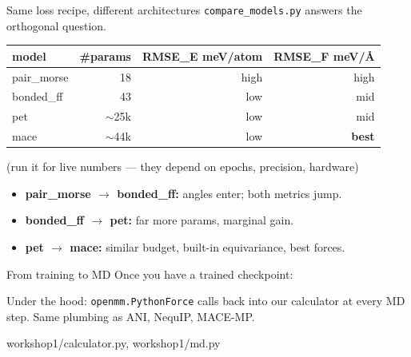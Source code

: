 \documentclass[aspectratio=169,11pt]{beamer}
\newcommand{\srcref}[1]{{\color{muted}\ttfamily\footnotesize #1}}
\begin{document}
\begin{frame}{Same loss recipe, different architectures}
  \texttt{compare\_models.py} answers the orthogonal question.

  \vspace{0.6em}
  \centering
  \small
  \begin{tabular}{lrrr}
    \toprule
    model & \#params & RMSE\_E meV/atom & RMSE\_F meV/\AA \\
    \midrule
    pair\_morse  &     18 & high & high \\
    bonded\_ff   &     43 & low  & mid  \\
    pet          & $\sim$25k & low  & mid  \\
    mace         & $\sim$44k & low  & \textbf{best} \\
    \bottomrule
  \end{tabular}

  {\color{muted}\scriptsize (run it for live numbers --- they depend on epochs, precision, hardware)}

  \vspace{0.6em}
  \small
  \begin{itemize}
    \item \textbf{pair\_morse $\to$ bonded\_ff:} angles enter; both metrics jump.
    \item \textbf{bonded\_ff $\to$ pet:} far more params, marginal gain.
    \item \textbf{pet $\to$ mace:} similar budget, built-in equivariance, best forces.
  \end{itemize}
\end{frame}

\begin{frame}{From training to MD}
  Once you have a trained checkpoint:

  \vspace{0.6em}

  \vspace{0.8em}
  Under the hood: \texttt{openmm.PythonForce} calls back into our
  calculator at every MD step. Same plumbing as ANI, NequIP, MACE-MP.

  \vspace{0.6em}
  \srcref{workshop1/calculator.py}, \srcref{workshop1/md.py}
\end{frame}
\end{document}
